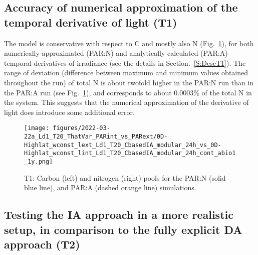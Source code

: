 \documentclass[gmd, manuscript]{copernicus}
\newcommand{\onur}[1]{\textcolor{blue}{\{Onur: #1\}}}
\newcommand{\markus}[1]{\textcolor{blue}{\{Markus: #1\}}}
\begin{document}
\subsection{Accuracy of numerical approximation of the temporal derivative of light (T1)}
The model is conservative with respect to C and mostly also N (Fig.~\ref{f.T1res}), for both numerically-approximated (PAR:N) and analytically-calculated (PAR:A) temporal derivatives of irradiance (see the details in Section.~\ref{S:DescT1}). The range of deviation (difference between maximum and minimum values obtained throughout the run) of total N is about twofold higher in the PAR:N run than in the PAR:A run (see Fig.~\ref{f.T1res}), and corresponds to about 0.0003\% of the total N in the system. This suggests that the numerical approximation of the derivative of light does introduce some additional error.

\begin{figure}[ht!]
\texttt{[image: figures/2022-03-22a\_Ld1\_T20\_ThatVar\_PARint\_vs\_PARext/0D-Highlat\_wconst\_lext\_Ld1\_T20\_CbasedIA\_modular\_24h\_vs\_0D-Highlat\_wconst\_lint\_Ld1\_T20\_CbasedIA\_modular\_24h\_cont\_abio1\_1y.png]}
\caption{T1: Carbon (left) and nitrogen (right) pools for the PAR:N (solid blue line), and PAR:A (dashed orange line) simulations.
\label{f.T1res}}
\end{figure}

\FloatBarrier%

\subsection{Testing the IA approach in a more realistic setup, in comparison to the fully explicit DA approach (T2)}
\end{document}
